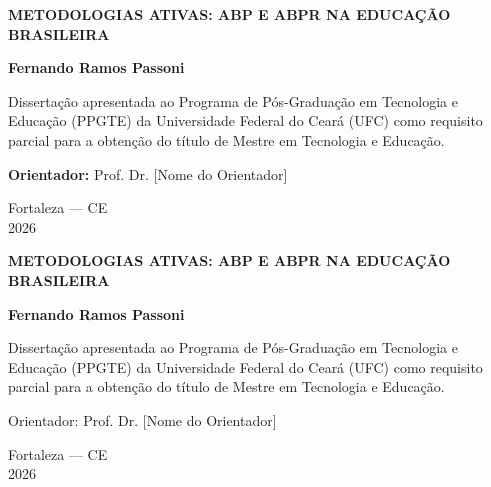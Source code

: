 \documentclass[12pt,a4paper,twoside,openright]{book}
\newcommand{\autordissertacao}{Fernando Ramos Passoni}
\newcommand{\nomedissertacao}{Metodologias Ativas: ABP e ABPr na Educação Brasileira}
\newcommand{\programa}{Programa de Pós-Graduação em Tecnologia e Educação (PPGTE)}
\newcommand{\instituicao}{Universidade Federal do Ceará (UFC)}
\newcommand{\orientador}{Prof. Dr. [Nome do Orientador]}
\newcommand{\cidadedefesa}{Fortaleza}
\newcommand{\estadodefesa}{CE}
\newcommand{\anodefesa}{2026}
\begin{document}
\frontmatter
\pagestyle{brief}

\begin{titlepage}
\begin{center}
\vspace*{2cm}

{\Large\textbf{\MakeUppercase{\nomedissertacao}}}

\vspace{2cm}

{\large\textbf{\autordissertacao}}

\vspace{3cm}

Dissertação apresentada ao \programa{} da \instituicao{} como requisito parcial para a obtenção do título de Mestre em Tecnologia e Educação.

\vspace{1cm}
\textbf{Orientador:} \orientador{}

\vspace{3cm}

{\large \cidadedefesa{} --- \estadodefesa{}\\\anodefesa{}}

\end{center}
\end{titlepage}

\thispagestyle{empty}
\begin{center}
\vspace*{3cm}

{\large\textbf{\MakeUppercase{\nomedissertacao}}}

\vspace{2cm}

{\large\textbf{\autordissertacao}}

\vspace{3cm}

Dissertação apresentada ao \programa{} da \instituicao{} como requisito parcial para a obtenção do título de Mestre em Tecnologia e Educação.

Orientador: \orientador{}

\vspace{3cm}

{\large \cidadedefesa{} --- \estadodefesa{}\\\anodefesa{}}

\end{center}
\newpage
\end{document}
